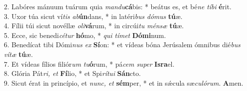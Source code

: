 2. Labóres mánuum tuárum quia \textit{mandu}\textbf{cá}bis: * beátus es, et bé\textit{ne tíbi} \textbf{é}rit.\\
3. Uxor túa sicut ví\textit{tis ab}\textbf{ún}dans, * in latéri\textit{bus dómus} \textbf{tú}æ.\\
4. Fílii túi sicut novéllæ \textit{oli}\textbf{vá}rum, * in circúi\textit{tu ménsæ} \textbf{tú}æ.\\
5. Ecce, sic benedi\textit{cétur} \textbf{hó}mo, * \textit{qui tímet} \textbf{Dómi}num.\\
6. Benedícat tibi Dómi\textit{nus ex} \textbf{Sí}on: * et vídeas bóna Jerúsalem ómnibus dié\textit{bus vítæ} \textbf{tú}æ.\\
7. Et vídeas fílios filiór\textit{um tu}\textbf{ó}rum, * pá\textit{cem super} \textbf{Isra}el.\\
8. Glória Pát\textit{ri, et} \textbf{Fí}lio, * et Spi\textit{rítui} \textbf{Sán}cto.\\
9. Sicut érat in princípio, et \textit{nunc, et} \textbf{sém}per, * et in sǽcula sæ\textit{culórum}. \textbf{A}men.